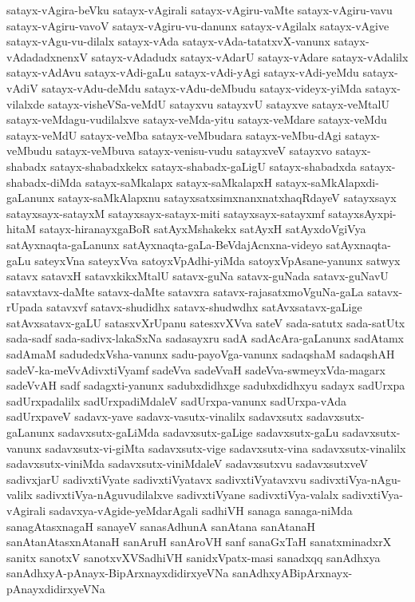 {satayx-vAgira-beVku
satayx-vAgirali
satayx-vAgiru-vaMte
satayx-vAgiru-vavu
satayx-vAgiru-vavoV
satayx-vAgiru-vu-danunx
satayx-vAgilalx
satayx-vAgive
satayx-vAgu-vu-dilalx
satayx-vAda
satayx-vAda-tatatxvX-vanunx
satayx-vAdadadxnenxV
satayx-vAdadudx
satayx-vAdarU
satayx-vAdare
satayx-vAdalilx
satayx-vAdAvu
satayx-vAdi-gaLu
satayx-vAdi-yAgi
satayx-vAdi-yeMdu
satayx-vAdiV
satayx-vAdu-deMdu
satayx-vAdu-deMbudu
satayx-videyx-yiMda
satayx-vilalxde
satayx-visheVSa-veMdU
satayxvu
satayxvU
satayxve
satayx-veMtalU
satayx-veMdagu-vudilalxve
satayx-veMda-yitu
satayx-veMdare
satayx-veMdu
satayx-veMdU
satayx-veMba
satayx-veMbudara
satayx-veMbu-dAgi
satayx-veMbudu
satayx-veMbuva
satayx-venisu-vudu
satayxveV
satayxvo
satayx-shabadx
satayx-shabadxkekx
satayx-shabadx-gaLigU
satayx-shabadxda
satayx-shabadx-diMda
satayx-saMkalapx
satayx-saMkalapxH
satayx-saMkAlapxdi-gaLanunx
satayx-saMkAlapxnu
satayxsatxsimxnanxnatxhaqRdayeV
satayxsayx
satayxsayx-satayxM
satayxsayx-satayx-miti
satayxsayx-satayxmf
satayxsAyxpi-hitaM
satayx-hiranayxgaBoR
satAyxMshakekx
satAyxH
satAyxdoVgiVya
satAyxnaqta-gaLanunx
satAyxnaqta-gaLa-BeVdajAcnxna-videyo
satAyxnaqta-gaLu
sateyxVna
sateyxVva
satoyxVpAdhi-yiMda
satoyxVpAsane-yanunx
satwyx
satavx
satavxH
satavxkikxMtalU
satavx-guNa
satavx-guNada
satavx-guNavU
satavxtavx-daMte
satavx-daMte
satavxra
satavx-rajasatxmoVguNa-gaLa
satavx-rUpada
satavxvf
satavx-shudidhx
satavx-shudwdhx
satAvxsatavx-gaLige
satAvxsatavx-gaLU
satasxvXrUpanu
satesxvXVva
sateV
sada-satutx
sada-satUtx
sada-sadf
sada-sadivx-lakaSxNa
sadasayxru
sadA
sadAcAra-gaLanunx
sadAtamx
sadAmaM
sadudedxVsha-vanunx
sadu-payoVga-vanunx
sadaqshaM
sadaqshAH
sadeV-ka-meVvAdivxtiVyamf
sadeVva
sadeVvaH
sadeVva-swmeyxVda-magarx
sadeVvAH
sadf
sadagxti-yanunx
sadubxdidhxge
sadubxdidhxyu
sadayx
sadUrxpa
sadUrxpadalilx
sadUrxpadiMdaleV
sadUrxpa-vanunx
sadUrxpa-vAda
sadUrxpaveV
sadavx-yave
sadavx-vasutx-vinalilx
sadavxsutx
sadavxsutx-gaLanunx
sadavxsutx-gaLiMda
sadavxsutx-gaLige
sadavxsutx-gaLu
sadavxsutx-vanunx
sadavxsutx-vi-giMta
sadavxsutx-vige
sadavxsutx-vina
sadavxsutx-vinalilx
sadavxsutx-viniMda
sadavxsutx-viniMdaleV
sadavxsutxvu
sadavxsutxveV
sadivxjarU
sadivxtiVyate
sadivxtiVyatavx
sadivxtiVyatavxvu
sadivxtiVya-nAgu-valilx
sadivxtiVya-nAguvudilalxve
sadivxtiVyane
sadivxtiVya-valalx
sadivxtiVya-vAgirali
sadavxya-vAgide-yeMdarAgali
sadhiVH
sanaga
sanaga-niMda
sanagAtasxnagaH
sanayeV
sanasAdhunA
sanAtana
sanAtanaH
sanAtanAtasxnAtanaH
sanAruH
sanAroVH
sanf
sanaGxTaH
sanatxminadxrX
sanitx
sanotxV
sanotxvXVSadhiVH
sanidxVpatx-masi
sanadxqq
sanAdhxya
sanAdhxyA-pAnayx-BipArxnayxdidirxyeVNa
sanAdhxyABipArxnayx-pAnayxdidirxyeVNa
}
